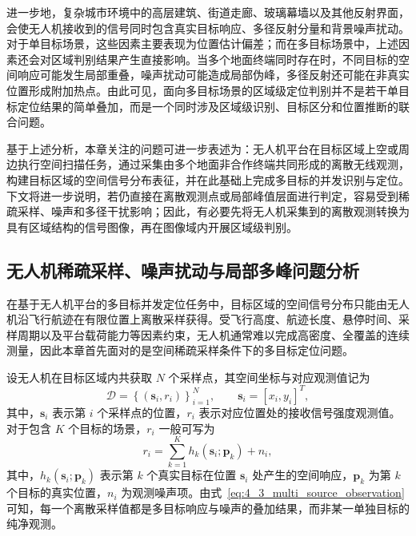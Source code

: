 进一步地，复杂城市环境中的高层建筑、街道走廊、玻璃幕墙以及其他反射界面，会使无人机接收到的信号同时包含真实目标响应、多径反射分量和背景噪声扰动。对于单目标场景，这些因素主要表现为位置估计偏差；而在多目标场景中，上述因素还会对区域判别结果产生直接影响。当多个地面终端同时存在时，不同目标的空间响应可能发生局部重叠，噪声扰动可能造成局部伪峰，多径反射还可能在非真实位置形成附加热点。由此可见，面向多目标场景的区域级定位判别并不是若干单目标定位结果的简单叠加，而是一个同时涉及区域级识别、目标区分和位置推断的联合问题。


基于上述分析，本章关注的问题可进一步表述为：无人机平台在目标区域上空或周边执行空间扫描任务，通过采集由多个地面非合作终端共同形成的离散无线观测，构建目标区域的空间信号分布表征，并在此基础上完成多目标的并发识别与定位。下文将进一步说明，若仍直接在离散观测点或局部峰值层面进行判定，容易受到稀疏采样、噪声和多径干扰影响；因此，有必要先将无人机采集到的离散观测转换为具有区域结构的信号图像，再在图像域内开展区域级判别。

\subsection{无人机稀疏采样、噪声扰动与局部多峰问题分析}
\label{subsec:4_1_3}

在基于无人机平台的多目标并发定位任务中，目标区域的空间信号分布只能由无人机沿飞行航迹在有限位置上离散采样获得。受飞行高度、航迹长度、悬停时间、采样周期以及平台载荷能力等因素约束，无人机通常难以完成高密度、全覆盖的连续测量，因此本章首先面对的是空间稀疏采样条件下的多目标定位问题。

设无人机在目标区域内共获取 \(N\) 个采样点，其空间坐标与对应观测值记为
\begin{equation}
\mathcal{D}
=
\left\{
(\mathbf{s}_i,r_i)
\right\}_{i=1}^{N},
\qquad
\mathbf{s}_i=[x_i,y_i]^T,
\label{eq:4_2_sparse_sampling_data}
\end{equation}
其中，\(\mathbf{s}_i\) 表示第 \(i\) 个采样点的位置，\(r_i\) 表示对应位置处的接收信号强度观测值。对于包含 \(K\) 个目标的场景，\(r_i\) 一般可写为
\begin{equation}
r_i
=
\sum_{k=1}^{K} h_k(\mathbf{s}_i;\mathbf{p}_k)
+
n_i,
\label{eq:4_3_multi_source_observation}
\end{equation}
其中，\(h_k(\mathbf{s}_i;\mathbf{p}_k)\) 表示第 \(k\) 个真实目标在位置 \(\mathbf{s}_i\) 处产生的空间响应，\(\mathbf{p}_k\) 为第 \(k\) 个目标的真实位置，\(n_i\) 为观测噪声项。由式~\eqref{eq:4_3_multi_source_observation} 可知，每一个离散采样值都是多目标响应与噪声的叠加结果，而非某一单独目标的纯净观测。

